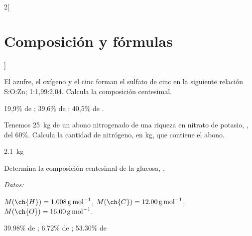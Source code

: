 \documentclass[10pt]{article}
\newenvironment{gexdatos}{
      \vspace{2pt}
      \noindent\textit{Datos:}
    }{\vspace{5pt}}
\begin{document}
\begin{multicols}{2}[
  \section{Composición y fórmulas}
  ]

  \begin{exercise}[
      tags    = {termodinámica, entalpía, entalpia de reacción, calor},
      topics  = {química, termoquímica, termodinámica},
      source  = {FQ 1B OXF 2015, p43, e40},
    ]
    El azufre, el oxígeno y el cinc forman el sulfato de cinc en la siguiente relación S:O:Zn; 1:1,99:2,04. Calcula la composición centesimal.
  \end{exercise}

  \begin{solution}
    19,9\% de ; 39,6\% de ; 40,5\% de .
  \end{solution}




  \begin{exercise}[
      tags    = {termodinámica, entalpía, entalpia de reacción, calor},
      topics  = {química, termoquímica, termodinámica},
      source  = {FQ 1B OXF 2015, p43, e41},
    ]
    Tenemos \SI{25}{\kilo\gram} de un abono nitrogenado de una riqueza en nitrato de potasio, , del 60\%. Calcula la cantidad de nitrógeno, en \si{\kilo\gram}, que contiene el abono.
  \end{exercise}

  \begin{solution}
    \SI{2.1}{\kilo\gram}
  \end{solution}



  \begin{exercise}[
      tags    = {termodinámica, entalpía, entalpia de reacción, calor},
      topics  = {química, termoquímica, termodinámica},
      source  = {FQ 1B SAN 2015, p43, e43},
    ]
    Determina la composición centesimal de la glucosa, .

    \begin{gexdatos}
      \( M(\ch{H}) = \SI{1.008}{\gram\per\mole} \),
      \( M(\ch{C}) = \SI{12.00}{\gram\per\mole} \),
      \( M(\ch{O}) = \SI{16.00}{\gram\per\mole} \).
    \end{gexdatos}
  \end{exercise}

  \begin{solution}
    39.98\% de ; 6.72\% de ; 53.30\% de 
  \end{solution}





\end{multicols}
\end{document}
